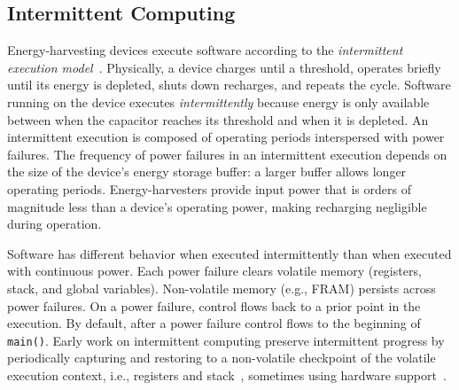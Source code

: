 
\subsection{Intermittent Computing}
\label{sec:background_consistency}

Energy-harvesting devices execute software according to the {\em intermittent execution model}~\cite{dino,chain,alpaca,ratchet}. Physically, a device charges until a threshold, operates briefly until its energy is depleted, shuts down recharges, and repeats the cycle. Software running on the device executes {\em intermittently} because energy is only available between when the capacitor reaches its threshold and when it is depleted. An intermittent execution is composed of operating periods interspersed with power failures. The frequency of power failures in an intermittent execution depends on the size of the device's energy storage buffer: a larger buffer allows longer operating periods. Energy-harvesters provide input power that is orders of magnitude less than a device's operating power, making recharging negligible during operation.

Software has different behavior when executed intermittently than when executed with continuous power. Each power failure clears volatile memory (registers, stack, and global variables). Non-volatile memory (e.g., FRAM) persists across power failures. On a power failure, control flows back to a prior point in the execution. By default, after a power failure control flows to the beginning of {\tt main()}. Early work on intermittent computing preserve intermittent progress by periodically capturing and restoring to a non-volatile checkpoint of the volatile execution context, i.e., registers and stack~\cite{mementos,quickrecall}, sometimes using hardware support~\cite{mementos,mottola2017harvos,hibernusplusplus,hibernus,idetic}. 

